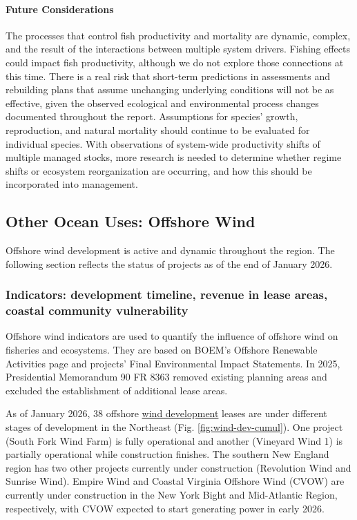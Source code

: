 \documentclass[
  10pt,
]{article}
\begin{document}
\paragraph{Future Considerations}\label{future-considerations-2}

The processes that control fish productivity and mortality are dynamic, complex, and the result of the interactions between multiple system drivers. Fishing effects could impact fish productivity, although we do not explore those connections at this time. There is a real risk that short-term predictions in assessments and rebuilding plans that assume unchanging underlying conditions will not be as effective, given the observed ecological and environmental process changes documented throughout the report. Assumptions for species' growth, reproduction, and natural mortality should continue to be evaluated for individual species. With observations of system-wide productivity shifts of multiple managed stocks, more research is needed to determine whether regime shifts or ecosystem reorganization are occurring, and how this should be incorporated into management.

\subsection{Other Ocean Uses: Offshore Wind}\label{other-ocean-uses-offshore-wind}

Offshore wind development is active and dynamic throughout the region. The following section reflects the status of projects as of the end of January 2026.

\subsubsection{Indicators: development timeline, revenue in lease areas, coastal community vulnerability}\label{indicators-development-timeline-revenue-in-lease-areas-coastal-community-vulnerability}

Offshore wind indicators are used to quantify the influence of offshore wind on fisheries and ecosystems. They are based on BOEM's Offshore Renewable Activities page and projects' Final Environmental Impact Statements. In 2025, Presidential Memorandum 90 FR 8363 removed existing planning areas and excluded the establishment of additional lease areas.

As of January 2026, 38 offshore \href{https://noaa-edab.github.io/catalog/wind_dev_speed.html}{wind development} leases are under different stages of development in the Northeast (Fig. \ref{fig:wind-dev-cumul}). One project (South Fork Wind Farm) is fully operational and another (Vineyard Wind 1) is partially operational while construction finishes. The southern New England region has two other projects currently under construction (Revolution Wind and Sunrise Wind). Empire Wind and Coastal Virginia Offshore Wind (CVOW) are currently under construction in the New York Bight and Mid-Atlantic Region, respectively, with CVOW expected to start generating power in early 2026.
\end{document}
